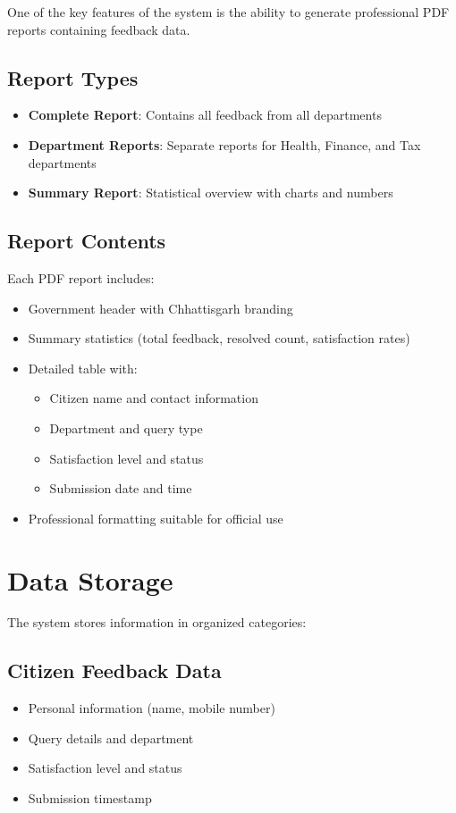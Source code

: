 \documentclass[12pt,a4paper]{article}
\begin{document}
One of the key features of the system is the ability to generate professional PDF reports containing feedback data.

\subsection{Report Types}
\begin{itemize}
    \item \textbf{Complete Report}: Contains all feedback from all departments
    \item \textbf{Department Reports}: Separate reports for Health, Finance, and Tax departments
    \item \textbf{Summary Report}: Statistical overview with charts and numbers
\end{itemize}

\subsection{Report Contents}
Each PDF report includes:
\begin{itemize}
    \item Government header with Chhattisgarh branding
    \item Summary statistics (total feedback, resolved count, satisfaction rates)
    \item Detailed table with:
    \begin{itemize}
        \item Citizen name and contact information
        \item Department and query type
        \item Satisfaction level and status
        \item Submission date and time
    \end{itemize}
    \item Professional formatting suitable for official use
\end{itemize}

\section{Data Storage}

The system stores information in organized categories:

\subsection{Citizen Feedback Data}
\begin{itemize}
    \item Personal information (name, mobile number)
    \item Query details and department
    \item Satisfaction level and status
    \item Submission timestamp
\end{itemize}
\end{document}
